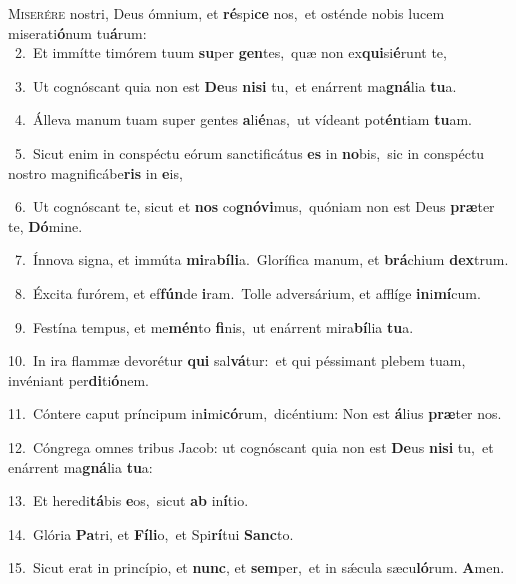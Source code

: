 \lettrine{\initial\textcolor{\initialcolor}{M}}{iserére} nostri, Deus ómnium, et \textbf{ré}\-spi\textbf{ce} nos,~\star et osténde nobis lucem miserati\-\textbf{ó}\-num tu\-\textbf{á}\-rum:\\
{\numbfont\textcolor{\numbcolor}{~2.}}~Et immítte timórem tuum \textbf{su}\-per \textbf{gen}\-tes,~\star quæ non ex\-\textbf{qui}\-si\-\textbf{é}\-runt te,\par
{\numbfont\textcolor{\numbcolor}{~3.}}~Ut cognóscant quia non est \textbf{De}\-us \textbf{ni}\-\textbf{si} tu,~\star et enárrent ma\-\textbf{gná}\-lia \textbf{tu}\-a.\par
{\numbfont\textcolor{\numbcolor}{~4.}}~Álleva manum tuam super gentes \textbf{a}\-li\-\textbf{é}\-nas,~\star ut vídeant pot\-\textbf{én}\-tiam \textbf{tu}\-am.\par
{\numbfont\textcolor{\numbcolor}{~5.}}~Sicut enim in conspéctu eórum sanctificátus \textbf{es} in \textbf{no}\-bis,~\star sic in conspéctu nostro magnificábe\textbf{ris} in \textbf{e}\-is,\par
{\numbfont\textcolor{\numbcolor}{~6.}}~Ut cognóscant te, sicut et \textbf{nos} co\-\textbf{gnó}\-\textbf{vi}mus,~\star quóniam non est Deus \textbf{præ}\-ter te, \textbf{Dó}\-mine.\par
{\numbfont\textcolor{\numbcolor}{~7.}}~Ínnova signa, et immúta \textbf{mi}\-ra\-\textbf{bí}\-\textbf{li}a.~\star Glorífica manum, et \textbf{brá}\-chium \textbf{dex}\-trum.\par
{\numbfont\textcolor{\numbcolor}{~8.}}~Éxcita furórem, et ef\-\textbf{fún}\-de \textbf{i}\-ram.~\star Tolle adversárium, et afflíge \textbf{in}\-i\-\textbf{mí}\-cum.\par
{\numbfont\textcolor{\numbcolor}{~9.}}~Festína tempus, et me\-\textbf{mén}\-to \textbf{fi}\-nis,~\star ut enárrent mira\-\textbf{bí}\-lia \textbf{tu}\-a.\par
{\numbfont\textcolor{\numbcolor}{10.}}~In ira flammæ devorétur \textbf{qui} sal\-\textbf{vá}\-tur:~\star et qui péssimant plebem tuam, invéniant per\-\textbf{di}\-ti\-\textbf{ó}\-nem.\par
{\numbfont\textcolor{\numbcolor}{11.}}~Cóntere caput príncipum in\-\textbf{i}\-mi\-\textbf{có}\-rum,~\star dicéntium: Non est \textbf{á}\-lius \textbf{præ}\-ter nos.\par
{\numbfont\textcolor{\numbcolor}{12.}}~Cóngrega omnes tribus Jacob: ut cognóscant quia non est \textbf{De}\-us \textbf{ni}\-\textbf{si} tu,~\star et enárrent ma\-\textbf{gná}\-lia \textbf{tu}\-a:\par
{\numbfont\textcolor{\numbcolor}{13.}}~Et heredi\-\textbf{tá}\-bis \textbf{e}\-os,~\star sicut \textbf{ab} in\-\textbf{í}\-tio.\par
{\numbfont\textcolor{\numbcolor}{14.}}~Glória \textbf{Pa}\-tri, et \textbf{Fí}\-\textbf{li}o,~\star et Spi\-\textbf{rí}\-tui \textbf{Sanc}\-to.\par
{\numbfont\textcolor{\numbcolor}{15.}}~Sicut erat in princípio, et \textbf{nunc}\-, et \textbf{sem}\-per,~\star et in sǽcula sæcu\-\textbf{ló}\-rum. \textbf{A}\-men.\par
